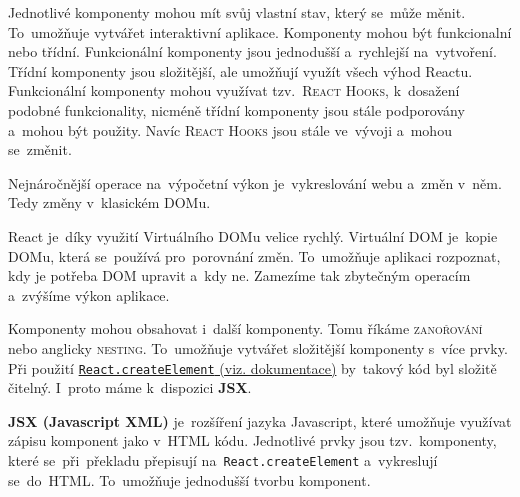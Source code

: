 \documentclass[14pt,a4paper]{article}
\begin{document}
        Jednotlivé komponenty mohou mít svůj vlastní stav, který se~může měnit. To~umožňuje vytvářet interaktivní aplikace.
        Komponenty mohou být funkcionalní nebo třídní. Funkcionální komponenty jsou jednodušší a~rychlejší na~vytvoření.
        Třídní komponenty jsou složitější, ale umožňují využít všech výhod Reactu. Funkcionální komponenty mohou využívat tzv.~\textsc{React Hooks}, k~dosažení podobné funkcionality, nicméně třídní komponenty jsou stále podporovány a~mohou být použity.
        Navíc \textsc{React Hooks} jsou stále ve~vývoji a~mohou se~změnit.

        Nejnáročnější operace na~výpočetní výkon je~vykreslování webu a~změn v~něm. Tedy změny v~klasickém DOMu.

        React je~díky využití Virtuálního DOMu velice rychlý. Virtuální DOM je~kopie DOMu, která se~používá pro~porovnání změn.
        To~umožňuje aplikaci rozpoznat, kdy je potřeba DOM upravit a~kdy ne. Zamezíme tak zbytečným operacím a~zvýšíme výkon aplikace. \parencite{elrom2021react}

        Komponenty mohou obsahovat i~další komponenty. Tomu říkáme \textsc{zanořování} nebo anglicky \textsc{nesting}. To~umožňuje vytvářet složitější komponenty s~více prvky.
        Při použití \href{https://react.dev/reference/react/createElement}{\texttt{React.createElement} (viz. dokumentace)} by~takový kód byl složitě čitelný. I~proto máme k~dispozici \textbf{JSX}.
        
        \textbf{JSX (Javascript XML)} je~rozšíření jazyka Javascript, které umožňuje využívat zápisu komponent jako v~HTML kódu. Jednotlivé prvky jsou tzv.~komponenty, které se~při~překladu přepisují na~\texttt{React.createElement} a~vykreslují se~do~HTML. To~umožňuje jednodušší tvorbu komponent. \parencite{reactJSX}
\end{document}
